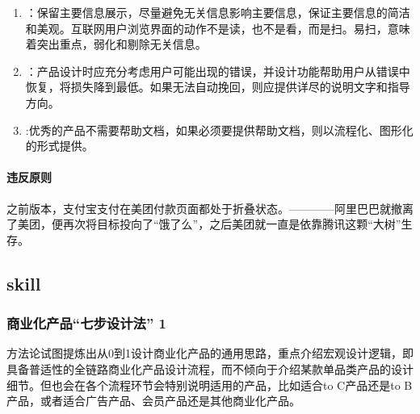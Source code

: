 \documentclass[letterpaper,11pt,english]{sphinxmanual}
\begin{document}
\begin{enumerate}
\item {} 
：保留主要信息展示，尽量避免无关信息影响主要信息，保证主要信息的简洁和美观。互联网用户浏览界面的动作不是读，也不是看，而是扫。易扫，意味着突出重点，弱化和剔除无关信息。

\item {} 
：产品设计时应充分考虑用户可能出现的错误，并设计功能帮助用户从错误中恢复，将损失降到最低。如果无法自动挽回，则应提供详尽的说明文字和指导方向。

\item {} 
:优秀的产品不需要帮助文档，如果必须要提供帮助文档，则以流程化、图形化的形式提供。

\end{enumerate}


\paragraph{违反原则}
\label{\detokenize{chapter_idea/design:id4}}
之前版本，支付宝支付在美团付款页面都处于折叠状态。————阿里巴巴就撤离了美团，便再次将目标投向了“饿了么”，之后美团就一直是依靠腾讯这颗“大树”生存。
%
\begin{footnote}[140]\sphinxAtStartFootnote
{}
%
\end{footnote}


\subsection{skill}
\label{\detokenize{chapter_skill/index:skill}}\label{\detokenize{chapter_skill/index:chap-skill}}\label{\detokenize{chapter_skill/index::doc}}

\subsubsection{商业化产品“七步设计法” 1\sphinxfootnotemark[141]}
\label{\detokenize{chapter_skill/7steps:id1}}\label{\detokenize{chapter_skill/7steps::doc}}%
\begin{footnotetext}[141]\sphinxAtStartFootnote
{}
%
\end{footnotetext}\ignorespaces 
方法论试图提炼出从0到1设计商业化产品的通用思路，重点介绍宏观设计逻辑，即具备普适性的全链路商业化产品设计流程，而不倾向于介绍某款单品类产品的设计细节。但也会在各个流程环节会特别说明适用的产品，比如适合to
C产品还是to B产品，或者适合广告产品、会员产品还是其他商业化产品。
\end{document}
